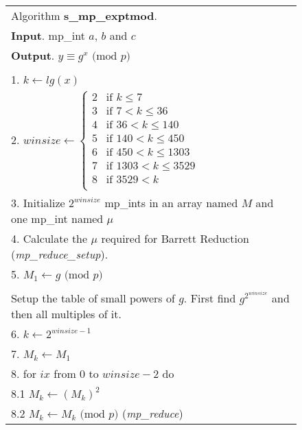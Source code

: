 \documentclass[b5paper]{book}
\begin{document}
\newpage\begin{figure}[!here]
\begin{small}
\begin{center}
\begin{tabular}{l}
\hline Algorithm \textbf{s\_mp\_exptmod}. \\
\textbf{Input}.   mp\_int $a$, $b$ and $c$ \\
\textbf{Output}.  $y \equiv g^x \mbox{ (mod }p\mbox{)}$ \\
\hline \\
1.  $k \leftarrow lg(x)$ \\
2.  $winsize \leftarrow  \left \lbrace \begin{array}{ll}
                              2 &  \mbox{if }k \le 7 \\
                              3 &  \mbox{if }7 < k \le 36 \\
                              4 &  \mbox{if }36 < k \le 140 \\
                              5 &  \mbox{if }140 < k \le 450 \\
                              6 &  \mbox{if }450 < k \le 1303 \\
                              7 &  \mbox{if }1303 < k \le 3529 \\
                              8 &  \mbox{if }3529 < k \\
                              \end{array} \right .$ \\
3.  Initialize $2^{winsize}$ mp\_ints in an array named $M$ and one mp\_int named $\mu$ \\
4.  Calculate the $\mu$ required for Barrett Reduction (\textit{mp\_reduce\_setup}). \\
5.  $M_1 \leftarrow g \mbox{ (mod }p\mbox{)}$ \\
\\
Setup the table of small powers of $g$.  First find $g^{2^{winsize}}$ and then all multiples of it. \\
6.  $k \leftarrow 2^{winsize - 1}$ \\
7.  $M_{k} \leftarrow M_1$ \\
8.  for $ix$ from 0 to $winsize - 2$ do \\
\hspace{3mm}8.1  $M_k \leftarrow \left ( M_k \right )^2$ \\
\hspace{3mm}8.2  $M_k \leftarrow M_k \mbox{ (mod }p\mbox{)}$ (\textit{mp\_reduce}) \\

\end{tabular}
\end{center}
\end{small}
\end{figure}
\end{document}
